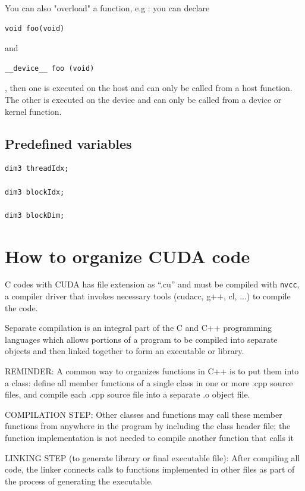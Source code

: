You can also "overload" a function, e.g : you can declare 
\begin{lstlisting}
void foo(void) 
\end{lstlisting}
and
\begin{lstlisting}
__device__ foo (void)
\end{lstlisting}
, then one is executed on the host and can only be called from a host function.
The other is executed on the device and can only be called from a device or
kernel function.


\subsection{Predefined variables}
\label{sec:predefined-variables}

\begin{lstlisting}
dim3 threadIdx; 

dim3 blockIdx; 

dim3 blockDim;
\end{lstlisting}


\section{How to organize CUDA code}


C codes with CUDA has file extension as ``.cu'' and must be compiled
with \verb!nvcc!, a compiler driver that invokes necessary tools
(cudacc, g++, cl, ...) to compile the code.

Separate compilation is an integral part of the C and C++ programming languages
which allows portions of a program to be compiled into separate objects and then
linked together to form an executable or library.

\begin{mdframed}

REMINDER: A common way to organizes functions in C++ is to put them into a
class: define all member functions of a single class in one or more .cpp source
files, and compile each .cpp source file into a separate .o object file.


COMPILATION STEP: Other classes and functions may call these member functions from anywhere in the
program by including the class header file; the function implementation is not
needed to compile another function that calls it

LINKING STEP (to generate library or final executable file): After compiling all
code, the linker connects calls to functions implemented in other files as part
of the process of generating the executable.

\end{mdframed}

